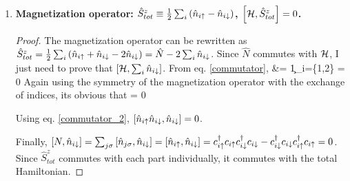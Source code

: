 \documentclass[12pt]{article}
\begin{document}
\begin{enumerate}
\begin{proof}
\begin{itemize}
\end{itemize}
The total Hamiltonian is just a sum of the three terms; since the number operator commutes individually with these terms, it obviously commutes with the total Hamiltonian.
\end{proof}
\item \bf{Magnetization operator}: \(\hat{S}^z_{tot} \equiv \frac{1}{2}\sum_i\left({\hat{n}_{i\uparrow}-\hat{n}_{i\downarrow}}\right)\), \(\left[{\mathcal{H}, \hat{S}^z_{tot}}\right]=0\).
\begin{proof}
The magnetization operator can be rewritten as \(\hat{S}^z_{tot} = \frac{1}{2}\sum_i\left({\hat{n}_{i\uparrow}+\hat{n}_{i\downarrow}-2\hat{n}_{i\downarrow}}\right) = \hat{N} - 2\sum_i\hat{n}_{i\downarrow}\). Since \(\hat{N}\) commutes with \(\mathcal{H}\), I just need to prove that \(\left[{\mathcal{H}, \sum_i\hat{n}_{i\downarrow}}\right]\). From eq. \ref{commutator}, 
\beq
{} &= \c{1}{\downarrow}\sum_{i=\{1,2\}} = 0
\eeq
Again using the symmetry of the magnetization operator with the exchange of indices, its obvious that
 = 0

Using eq. \ref{commutator_2}, \(\left[{\hat{n}_{i\uparrow}\hat{n}_{i\downarrow}, \hat{n}_{i\downarrow}}\right] = 0\).

Finally, \(\left[{N, \hat{n}_{i\downarrow}}\right]=\sum_{j\sigma}\left[{\hat{n}_{j\sigma},\hat{n}_{i\downarrow}}\right] = \left[{\hat{n}_{i\uparrow},\hat{n}_{i\downarrow}}\right] = c_{{i}{\uparrow}}^\dagger c_{{i}{\uparrow}}c_{{i}{\downarrow}}^\dagger c_{{i}{\downarrow}}-c_{{i}{\downarrow}}^\dagger c_{{i}{\downarrow}}c_{{i}{\uparrow}}^\dagger c_{{i}{\uparrow}} = 0\). Since \(\hat{S}^z_{tot}\) commutes with each part individually, it commutes with the total Hamiltonian.
\end{proof}


\end{enumerate}
\end{document}
